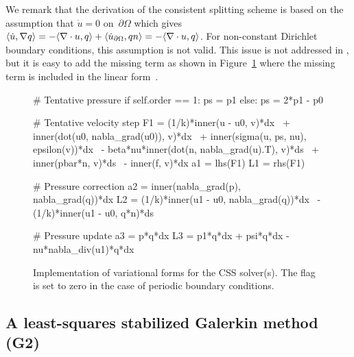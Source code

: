 We remark that the derivation of the consistent splitting scheme is
based on the assumption that $\dot{u} = 0$ on~$\partial\Omega$ which
gives $\renni{\nabla q}{\dot{u}} = -\renni{q}{\nabla \cdot u} +
\renni{qn}{\dot{u}_{\partial \Omega}} = -\renni{q}{\nabla \cdot
  u}$. For non-constant Dirichlet boundary conditions, this assumption
is not valid. This issue is not addressed in \citet{GuermondShen2003}, but it is
easy to add the missing term as shown in Figure~\ref{fig:impl_css}
where the missing term is included in the linear form~.

\begin{figure}
\bwfig
    \begin{python}
# Tentative pressure
if self.order == 1:
    ps = p1
else:
    ps = 2*p1 - p0

# Tentative velocity step
F1 = (1/k)*inner(u - u0, v)*dx \
   + inner(dot(u0, nabla_grad(u0)), v)*dx \
   + inner(sigma(u, ps, nu), epsilon(v))*dx \
   - beta*nu*inner(dot(n, nabla_grad(u).T), v)*ds \
   + inner(pbar*n, v)*ds \
   - inner(f, v)*dx
a1 = lhs(F1)
L1 = rhs(F1)

# Pressure correction
a2 = inner(nabla_grad(p), nabla_grad(q))*dx
L2 = (1/k)*inner(u1 - u0, nabla_grad(q))*dx \
   - (1/k)*inner(u1 - u0, q*n)*ds

# Pressure update
a3 = p*q*dx
L3 = p1*q*dx + psi*q*dx - nu*nabla_div(u1)*q*dx
    \end{python}
    \caption{Implementation of variational forms for the CSS
      solver(s). The flag  is set to zero in the case of
      periodic boundary conditions.}
    \label{fig:impl_css}
\end{figure}

\subsection{A least-squares stabilized Galerkin method (G2)}

